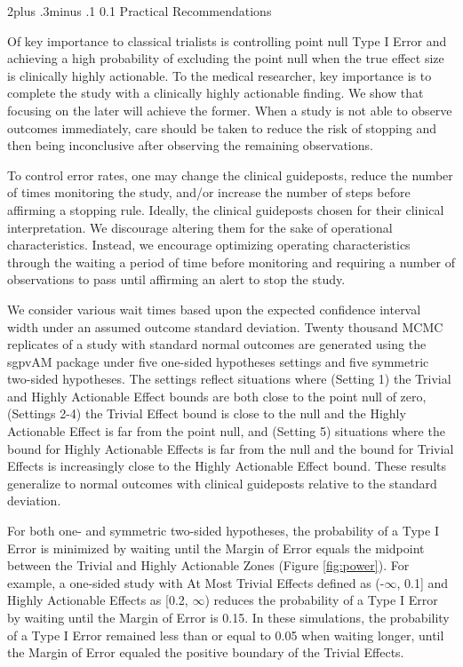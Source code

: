 \documentclass[12pt,oneside]{book}
\makeatletter
\newlength{\li}\setlength{\li}{14.48pt}
\newlength{\di}\setlength{\di}{-3.5mm}
\renewcommand\section{ \@startsection {section}{1}{\z@}%
    {2\@bls  plus .3\@bls minus .1\@bls}%
    {0.1\@bls}%
    {\centering\normalfont}}
\theoremstyle{definition}
\theoremstyle{definition}
\theoremstyle{definition}
\theoremstyle{remark}
\makeatother
\begin{document}
\hypertarget{practical-recommendations}{%
\section{Practical Recommendations}\label{practical-recommendations}}

Of key importance to classical trialists is controlling point null Type
I Error and achieving a high probability of excluding the point null
when the true effect size is clinically highly actionable. To the
medical researcher, key importance is to complete the study with a
clinically highly actionable finding. We show that focusing on the later
will achieve the former. When a study is not able to observe outcomes
immediately, care should be taken to reduce the risk of stopping and
then being inconclusive after observing the remaining observations.

To control error rates, one may change the clinical guideposts, reduce
the number of times monitoring the study, and/or increase the number of
steps before affirming a stopping rule. Ideally, the clinical guideposts
chosen for their clinical interpretation. We discourage altering them
for the sake of operational characteristics. Instead, we encourage
optimizing operating characteristics through the waiting a period of
time before monitoring and requiring a number of observations to pass
until affirming an alert to stop the study.

We consider various wait times based upon the expected confidence
interval width under an assumed outcome standard deviation. Twenty
thousand MCMC replicates of a study with standard normal outcomes are
generated using the sgpvAM package under five one-sided hypotheses
settings and five symmetric two-sided hypotheses. The settings reflect
situations where (Setting 1) the Trivial and Highly Actionable Effect
bounds are both close to the point null of zero, (Settings 2-4) the
Trivial Effect bound is close to the null and the Highly Actionable
Effect is far from the point null, and (Setting 5) situations where the
bound for Highly Actionable Effects is far from the null and the bound
for Trivial Effects is increasingly close to the Highly Actionable
Effect bound. These results generalize to normal outcomes with clinical
guideposts relative to the standard deviation.

For both one- and symmetric two-sided hypotheses, the probability of a
Type I Error is minimized by waiting until the Margin of Error equals
the midpoint between the Trivial and Highly Actionable Zones (Figure
\ref{fig:power}). For example, a one-sided study with At Most Trivial
Effects defined as (-\(\infty\), 0.1{]} and Highly Actionable Effects as
{[}0.2, \(\infty\)) reduces the probability of a Type I Error by waiting
until the Margin of Error is 0.15. In these simulations, the probability
of a Type I Error remained less than or equal to 0.05 when waiting
longer, until the Margin of Error equaled the positive boundary of the
Trivial Effects.
\end{document}
